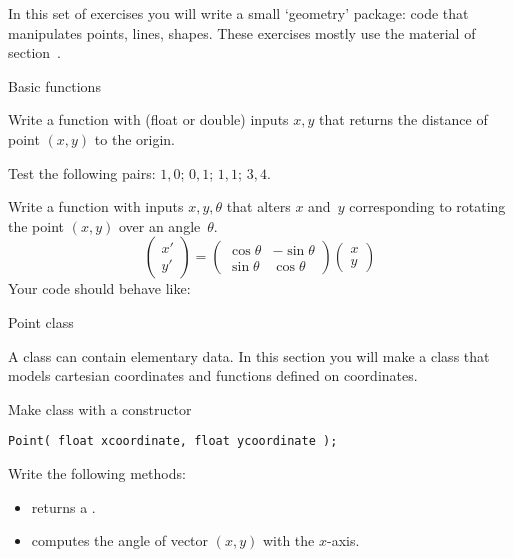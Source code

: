 
In this set of exercises you will write a small `geometry' package:
code that manipulates points, lines, shapes.
These exercises mostly use the material of section~.

 {Basic functions}
\label{sec:geom-basic}

\begin{exercise}
  \label{ex:func-pointdistance}
  Write a function with (float or double) inputs $x,y$ that returns the distance of
  point $(x,y)$ to the origin.

  Test the following pairs: $1,0$; $0,1$; $1,1$; $3,4$.
\end{exercise}

\begin{exercise}
  \label{ex:pointrotate}
  Write a function with inputs $x,y,\theta$ that alters $x$ and~$y$
  corresponding to rotating the point $(x,y)$ over an angle~$\theta$.
  \[
  \begin{pmatrix}
    x'\\y'
  \end{pmatrix} =
  \begin{pmatrix}
    \cos\theta& -\sin\theta\\ \sin\theta&\cos\theta
  \end{pmatrix}
  \begin{pmatrix}
    x\\y
  \end{pmatrix}
  \]
  Your code should behave like:
\end{exercise}

 {Point class}
\label{ex:pointfunc}


A class can contain elementary data. In this section you will make a
 class that models cartesian coordinates and functions
defined on coordinates.

\begin{exercise}
  \label{ex:geom:point}
  Make class  with a constructor
\begin{lstlisting}
Point( float xcoordinate, float ycoordinate );
\end{lstlisting}
Write the following methods:
\begin{itemize}
\item {} returns a .
\item {} computes the angle of vector $(x,y)$ with the $x$-axis.
\end{itemize}
\end{exercise}

